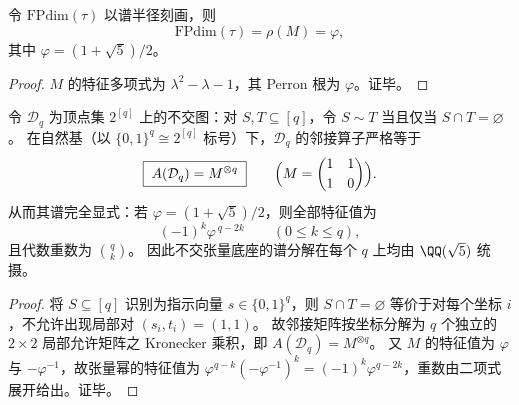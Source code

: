 \begin{corollary}\label{cor:pom-centralizer-fpdim-golden}
令 \(\mathrm{FPdim}(\tau)\) 以谱半径刻画，则
\[
\mathrm{FPdim}(\tau)=\rho(M)=\varphi,
\]
其中 \(\varphi=(1+\sqrt5)/2\)。
\end{corollary}
\begin{proof}
\(M\) 的特征多项式为 \(\lambda^2-\lambda-1\)，其 Perron 根为 \(\varphi\)。证毕。
\end{proof}



\begin{proposition}\label{prop:pom-disjointness-graph-tensor-power-spectrum}
令 \(\mathcal{D}_q\) 为顶点集 \(2^{[q]}\) 上的不交图：对 \(S,T\subseteq[q]\)，令 \(S\sim T\) 当且仅当 \(S\cap T=\varnothing\)。
在自然基（以 \(\{0,1\}^q\cong 2^{[q]}\) 标号）下，\(\mathcal{D}_q\) 的邻接算子严格等于
\[
\boxed{\;A(\mathcal{D}_q)=M^{\otimes q}\;}
\qquad\Bigl(M=\begin{pmatrix}1&1\\[2pt]1&0\end{pmatrix}\Bigr).
\]
从而其谱完全显式：若 \(\varphi=(1+\sqrt5)/2\)，则全部特征值为
\[
(-1)^k\varphi^{\,q-2k}\qquad(0\le k\le q),
\]
且代数重数为 \(\binom{q}{k}\)。
因此不交张量底座的谱分解在每个 \(q\) 上均由 \(\QQ(\sqrt5)\) 统摄。
\end{proposition}
\begin{proof}
将 \(S\subseteq[q]\) 识别为指示向量 \(s\in\{0,1\}^q\)，则 \(S\cap T=\varnothing\) 等价于对每个坐标 \(i\)，不允许出现局部对 \((s_i,t_i)=(1,1)\)。
故邻接矩阵按坐标分解为 \(q\) 个独立的 \(2\times 2\) 局部允许矩阵之 Kronecker 乘积，即 \(A(\mathcal{D}_q)=M^{\otimes q}\)。
又 \(M\) 的特征值为 \(\varphi\) 与 \(-\varphi^{-1}\)，故张量幂的特征值为 \(\varphi^{q-k}(-\varphi^{-1})^k=(-1)^k\varphi^{q-2k}\)，重数由二项式展开给出。证毕。
\end{proof}

